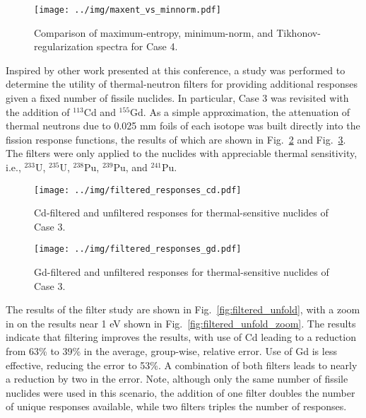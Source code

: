 \documentclass[journal]{IEEEtran}
\newcommand{\FIG}[1]{Fig.~\ref{#1}}               %
\begin{document}
\begin{figure}[h!tb]
  \centering
  \texttt{[image: ../img/maxent\_vs\_minnorm.pdf]}
  \caption{Comparison of maximum-entropy, minimum-norm, and Tikhonov-regularization spectra for Case 4.}
  \label{fig:maxent_vs_minnorm}
\end{figure}

Inspired by other work presented at this conference\cite{kaiba2017cso}, a study was performed to determine the utility of thermal-neutron filters for providing additional responses given a fixed number of fissile nuclides.  In particular, Case 3 was revisited with the addition of ${}^{113}$Cd and ${}^{155}$Gd.  As a simple approximation, the attenuation of thermal neutrons due to 0.025 mm foils of each isotope was built directly into the fission response functions, the results of which are shown in \FIG{fig:filtered_responses_cd} and \FIG{fig:filtered_responses_gd}.  The filters were only applied to the nuclides with appreciable thermal sensitivity, i.e., ${}^{233}$U, ${}^{235}$U, ${}^{238}$Pu, ${}^{239}$Pu, and ${}^{241}$Pu.

\begin{figure}[h!tb]
  \centering
  \texttt{[image: ../img/filtered\_responses\_cd.pdf]}
  \caption{Cd-filtered and unfiltered responses for thermal-sensitive nuclides of Case 3.}
  \label{fig:filtered_responses_cd}
\end{figure}

\begin{figure}[h!tb]
  \centering
  \texttt{[image: ../img/filtered\_responses\_gd.pdf]}
  \caption{Gd-filtered and unfiltered responses for thermal-sensitive nuclides of Case 3.}
  \label{fig:filtered_responses_gd}
\end{figure}

The results of the filter study are shown in \FIG{fig:filtered_unfold}, with a zoom in on the results near 1 eV shown in \FIG{fig:filtered_unfold_zoom}.  The results indicate that filtering improves the results, with use of Cd leading to a reduction from 63\% to 39\% in the average, group-wise, relative error.  Use of Gd is less effective, reducing the error to 53\%.  A combination of both filters leads to nearly a reduction by two in the error.  Note, although only the same number of fissile nuclides were used in this scenario, the addition of one filter doubles the number of unique responses available, while two filters triples the number of responses. 
\end{document}
